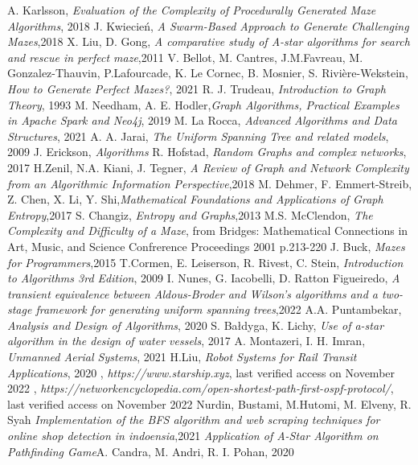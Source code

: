 
\begin{thebibliography}{100}
A. Karlsson, \emph{Evaluation of the Complexity of Procedurally Generated Maze Algorithms}, 2018
J. Kwiecień, \emph{A Swarm-Based Approach to Generate Challenging Mazes},2018
X. Liu, D. Gong, \emph{A comparative study of A-star algorithms for search and rescue in perfect maze},2011
V. Bellot, M. Cantres, J.M.Favreau, M. Gonzalez-Thauvin, P.Lafourcade, K. Le Cornec, B. Mosnier, S. Rivière-Wekstein,
\emph{How to Generate Perfect Mazes?}, 2021
R. J. Trudeau, \emph{Introduction to Graph Theory}, 1993
M. Needham, A. E. Hodler,\emph{Graph Algorithms, Practical Examples in Apache Spark and Neo4j}, 2019
M. La Rocca, \emph{Advanced Algorithms and Data Structures}, 2021 
A. A. Jarai, \emph{The Uniform Spanning Tree and related models}, 2009
 J. Erickson, \emph{Algorithms}
R. Hofstad, \emph{Random Graphs and complex networks}, 2017
H.Zenil, N.A. Kiani, J. Tegner, \emph{A Review of Graph and Network Complexity from an Algorithmic Information Perspective},2018
M. Dehmer, F. Emmert-Streib, Z. Chen, X. Li, Y. Shi,\emph{Mathematical Foundations and Applications of Graph Entropy},2017
S. Changiz, \emph{Entropy and Graphs},2013
M.S. McClendon, \emph{The Complexity and Difficulty of a Maze}, from Bridges: Mathematical Connections in Art, Music, and Science Confrerence Proceedings 2001 p.213-220
J. Buck, \emph{Mazes for Programmers},2015
T.Cormen, E. Leiserson, R. Rivest, C. Stein, \emph{Introduction to Algorithms 3rd Edition}, 2009
I. Nunes, G. Iacobelli, D. Ratton Figueiredo, \emph{A transient equivalence between Aldous-Broder and Wilson's algorithms and a two-stage framework for generating uniform spanning trees},2022
A.A. Puntambekar, \emph{Analysis and Design of Algorithms}, 2020 
S. Bałdyga, K. Lichy, \emph{Use of a-star algorithm in the design of water vessels}, 2017
A. Montazeri, I. H. Imran, \emph{Unmanned Aerial Systems}, 2021
H.Liu, \emph{Robot Systems for Rail Transit Applications}, 2020
, \emph{https://www.starship.xyz}, last verified access on November 2022
, \emph{https://networkencyclopedia.com/open-shortest-path-first-ospf-protocol/}, last verified access on November 2022
Nurdin, Bustami, M.Hutomi, M. Elveny, R. Syah \emph{Implementation of the BFS algorithm and web scraping techniques for online shop detection in indoensia},2021
 \emph{Application of A-Star Algorithm on Pathfinding Game}A. Candra, M. Andri, R. I. Pohan, 2020




\end{thebibliography}
